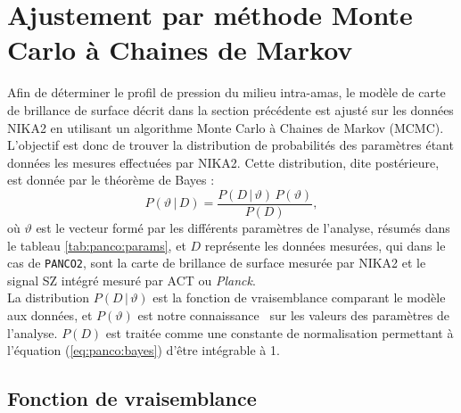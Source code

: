 \section{Ajustement par méthode Monte Carlo à Chaines de Markov}
\label{sec:panco:fit}

Afin de déterminer le profil de pression du milieu intra-amas, le modèle de carte de brillance de surface décrit dans la section précédente est ajusté sur les données NIKA2 en utilisant un algorithme Monte Carlo à Chaines de Markov (MCMC).
L'objectif est donc de trouver la distribution de probabilités des paramètres étant données les mesures effectuées par NIKA2.
Cette distribution, dite postérieure, est donnée par le théorème de Bayes :
\begin{equation}
    \label{eq:panco:bayes}
    P(\vartheta \,|\, D) = \frac{P(D \,|\, \vartheta) \, P(\vartheta)}{P(D)},
\end{equation}
où $\vartheta$ est le vecteur formé par les différents paramètres de l'analyse, résumés dans le tableau \ref{tab:panco:params}, et $D$ représente les données mesurées, qui dans le cas de \texttt{PANCO2}, sont la carte de brillance de surface mesurée par NIKA2 et le signal SZ intégré mesuré par ACT ou \textit{Planck}. \\
La distribution $P(D \,|\, \vartheta)$ est la fonction de vraisemblance comparant le modèle aux données, et $P(\vartheta)$ est notre connaissance \prior\ sur les valeurs des paramètres de l'analyse.
$P(D)$ est traitée comme une constante de normalisation permettant à l'équation (\ref{eq:panco:bayes}) d'être intégrable à 1.

\subsection{Fonction de vraisemblance} \label{sec:panco:likelihood}

